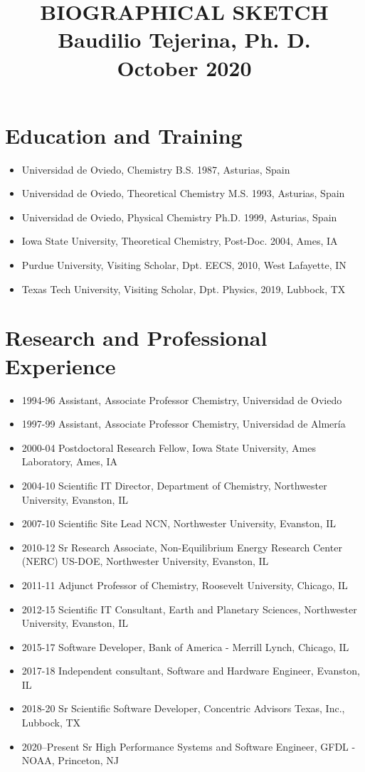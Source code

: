 \documentclass{article}
\title{\textbf{\Large BIOGRAPHICAL SKETCH \\ Baudilio Tejerina, Ph. D. \\ October 2020} \\
}
\author{}
\date{}
\begin{document}
\maketitle
\thispagestyle{empty}
\pagestyle{plain}

\section*{Education and Training}
\begin{itemize}
\item Universidad de Oviedo, Chemistry B.S. 1987, Asturias, Spain
\item Universidad de Oviedo, Theoretical Chemistry M.S. 1993, Asturias, Spain
\item Universidad de Oviedo, Physical Chemistry Ph.D. 1999, Asturias, Spain
\item Iowa State University, Theoretical Chemistry, Post-Doc. 2004, Ames, IA
\item Purdue University, Visiting Scholar, Dpt. EECS, 2010, West Lafayette, IN
\item Texas Tech University, Visiting Scholar, Dpt. Physics, 2019, Lubbock, TX
\end{itemize}

\section*{Research and Professional Experience}
\begin{itemize}
\item 1994-96 Assistant, Associate Professor Chemistry, Universidad de Oviedo
\item 1997-99 Assistant, Associate Professor Chemistry, Universidad de Almer\'{i}a
\item 2000-04 Postdoctoral Research Fellow, Iowa State University, Ames Laboratory, Ames, IA
\item 2004-10 Scientific IT Director, Department of Chemistry, Northwester University, Evanston, IL
\item 2007-10 Scientific Site Lead NCN, Northwester University, Evanston, IL
\item 2010-12 Sr Research Associate, Non-Equilibrium Energy Research Center (NERC) US-DOE, Northwester University, Evanston, IL
\item 2011-11 Adjunct Professor of Chemistry, Roosevelt University, Chicago, IL
\item 2012-15 Scientific IT Consultant, Earth and Planetary Sciences, Northwester University, Evanston, IL
\item 2015-17 Software Developer, Bank of America - Merrill Lynch, Chicago, IL
\item 2017-18 Independent consultant, Software and Hardware Engineer, Evanston, IL
\item 2018-20 Sr Scientific Software Developer, Concentric Advisors Texas, Inc., Lubbock, TX
\item 2020--Present Sr High Performance Systems and Software Engineer, GFDL - NOAA, Princeton, NJ

\end{itemize}
\end{document}
